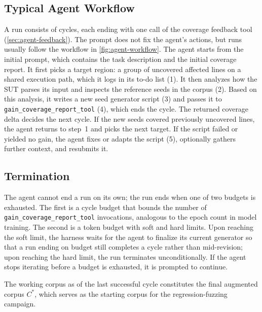 

\subsection{Typical Agent Workflow}
\label{sec:agent-workflow}



A run consists of cycles, each ending with one call of the coverage feedback tool (\cref{sec:agent-feedback}).
The prompt does not fix the agent's actions, but runs usually follow the workflow in \cref{fig:agent-workflow}.
The agent starts from the initial prompt, which contains the task description and the initial coverage report.
It first picks a target region: a group of uncovered affected lines on a shared execution path, which it logs in its to-do list (1).
It then analyzes how the \ac{SUT} parses its input and inspects the reference seeds in the corpus (2).
Based on this analysis, it writes a new seed generator script (3) and passes it to \texttt{gain\_coverage\_report\_tool} (4), which ends the cycle.
The returned coverage delta decides the next cycle.
If the new seeds covered previously uncovered lines, the agent returns to step~1 and picks the next target.
If the script failed or yielded no gain, the agent fixes or adapts the script (5), optionally gathers further context, and resubmits it.

\subsection{Termination}
\label{sec:agent-termination}

The agent cannot end a run on its own; the run ends when one of two budgets is exhausted.
The first is a cycle budget that bounds the number of \texttt{gain\_coverage\_report\_tool} invocations, analogous to the epoch count in model training.
The second is a token budget with soft and hard limits.
Upon reaching the soft limit, the harness waits for the agent to finalize its current generator so that a run ending on budget still completes a cycle rather than mid-revision; upon reaching the hard limit, the run terminates unconditionally.
If the agent stops iterating before a budget is exhausted, it is prompted to continue.

The working corpus as of the last successful cycle constitutes the final augmented corpus $C^*$, which serves as the starting corpus for the regression-fuzzing campaign.

